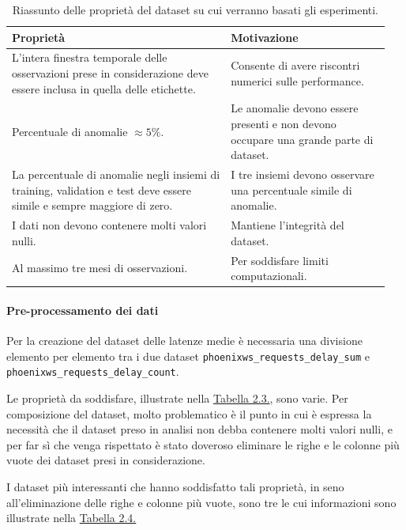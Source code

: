 \begin{table}[H]
    \centering
    \caption{Riassunto delle proprietà del dataset su cui verranno basati gli esperimenti.}
    \begin{tabular}{p{0.55\linewidth}p{0.4\linewidth}}
        \toprule
        \textbf{Proprietà} & \textbf{Motivazione}\\
        \toprule
        L'intera finestra temporale delle osservazioni prese in considerazione deve essere inclusa in quella delle 
        etichette. & Consente di avere riscontri numerici sulle performance.  \\
        \midrule
        Percentuale di anomalie $\approx 5\%$. & Le anomalie devono essere presenti e non devono occupare una grande parte di dataset.  \\
        \midrule
        La percentuale di anomalie negli insiemi di training, validation e test deve essere simile e sempre maggiore di zero. 
        & I tre insiemi devono osservare una percentuale simile di anomalie.\\
        \midrule
        I dati non devono contenere molti valori nulli. & Mantiene l'integrità del dataset. \\
        \midrule
        Al massimo tre mesi di osservazioni. & Per soddisfare limiti computazionali.\\
        \bottomrule
    \end{tabular}
    \label{tab:data-properties}
\end{table}

   \paragraph{Pre-processamento dei dati} Per la creazione del dataset delle latenze medie è necessaria una divisione 
   elemento per elemento tra i due dataset \texttt{phoenixws\_requests\_delay\_sum} e \texttt{phoenixws\_requests\_delay\_count}.

   Le proprietà da soddisfare, illustrate nella \hyperref[tab:data-properties]{Tabella 2.3.}, sono varie. Per composizione 
   del dataset, molto problematico è il punto in cui è espressa la necessità che il dataset preso in analisi non debba
   contenere molti valori nulli, e per far sì che venga rispettato è stato doveroso eliminare le righe e le 
   colonne più vuote dei dataset presi in considerazione. 

   I dataset più interessanti che hanno soddisfatto tali proprietà, in seno all'eliminazione delle righe e colonne più 
   vuote, sono tre le cui informazioni sono illustrate nella \hyperref[tab:data-info]{Tabella 2.4.}
    
